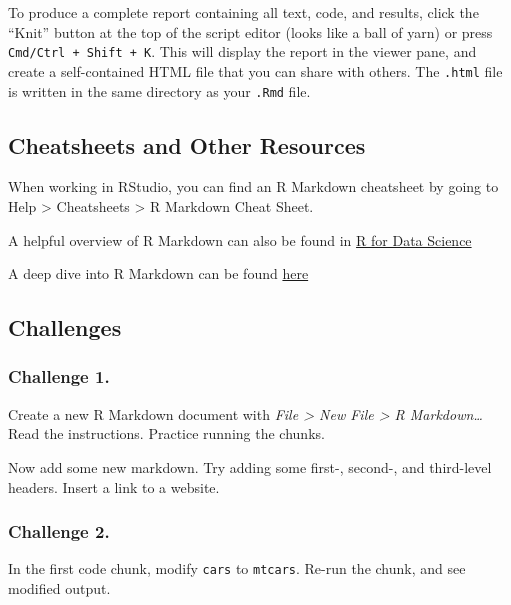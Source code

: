 \documentclass[]{book}
\begin{document}
To produce a complete report containing all text, code, and results, click the ``Knit'' button at the top of the script editor (looks like a ball of yarn) or press \texttt{Cmd/Ctrl\ +\ Shift\ +\ K}. This will display the report in the viewer pane, and create a self-contained HTML file that you can share with others. The \texttt{.html} file is written in the same directory as your \texttt{.Rmd} file.

\hypertarget{cheatsheets-and-other-resources}{%
\subsection{Cheatsheets and Other Resources}\label{cheatsheets-and-other-resources}}

When working in RStudio, you can find an R Markdown cheatsheet by going to Help \textgreater{} Cheatsheets \textgreater{} R Markdown Cheat Sheet.

A helpful overview of R Markdown can also be found in \href{https://r4ds.had.co.nz/r-markdown.html}{R for Data Science}

A deep dive into R Markdown can be found \href{https://bookdown.org/yihui/rmarkdown/}{here}

\hypertarget{challenges-1}{%
\subsection{Challenges}\label{challenges-1}}

\hypertarget{challenge-1.}{%
\subsubsection*{Challenge 1.}\label{challenge-1.}}

Create a new R Markdown document with \emph{File \textgreater{} New File \textgreater{} R Markdown\ldots{}} Read the instructions. Practice running the chunks.

Now add some new markdown. Try adding some first-, second-, and third-level headers. Insert a link to a website.

\hypertarget{challenge-2.}{%
\subsubsection*{Challenge 2.}\label{challenge-2.}}

In the first code chunk, modify \texttt{cars} to \texttt{mtcars}. Re-run the chunk, and see modified output.
\end{document}
